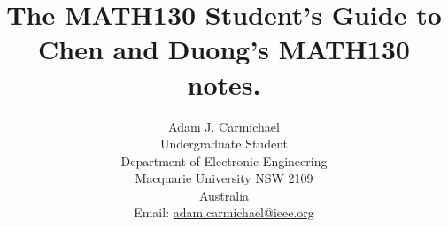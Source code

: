\begin{titlepage}
\title{
  The MATH130 Student's Guide to Chen and Duong's MATH130 notes.
}
%
\author{
  Adam J. Carmichael \\
  Undergraduate Student \\
  Department of Electronic Engineering \\
  Macquarie University NSW 2109 \\
  Australia \\
  Email: \url{adam.carmichael@ieee.org}
}%
%
\end{titlepage}

%
\maketitle
%


